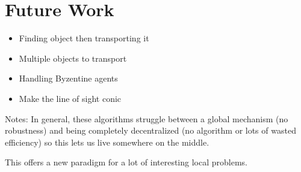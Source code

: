 \documentclass[12pt]{article}
\begin{document}
\section{Future Work}
\begin{itemize}
\item Finding object then transporting it
\item Multiple objects to transport
\item Handling Byzentine agents
\item Make the line of sight conic
\end{itemize}

Notes:
In general, these algorithms struggle between a global mechanism (no robustness) and being completely decentralized (no algorithm or lots of wasted efficiency) so this lets us live somewhere on the middle.

This offers a new paradigm for a lot of interesting local problems. 


\end{document}
